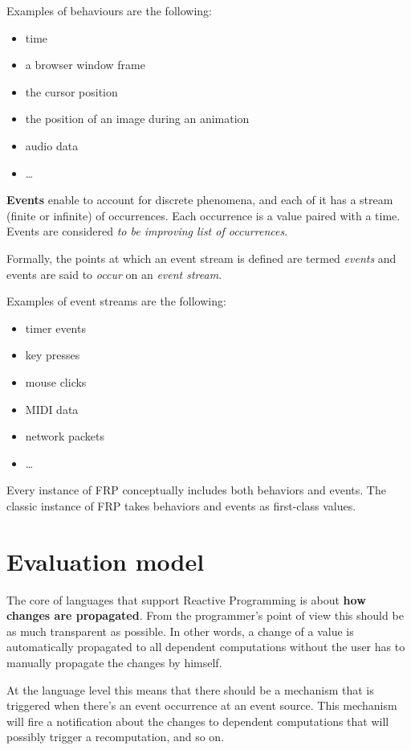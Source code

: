 Examples of behaviours are the following:

\begin{itemize}
\itemsep1pt\parskip0pt
\item
  time
\item
  a browser window frame
\item
  the cursor position
\item
  the position of an image during an animation
\item
  audio data
\item
  \ldots{}
\end{itemize}

\textbf{Events} enable to account for discrete phenomena, and each of it
has a stream (finite or infinite) of occurrences. Each occurrence is a
value paired with a time. Events are considered \emph{to be improving
list of occurrences}.

Formally, the points at which an event stream is defined are termed
\emph{events} and events are said to \emph{occur} on an \emph{event
stream}.

Examples of event streams are the following:

\begin{itemize}
\itemsep1pt\parskip0pt
\item
  timer events
\item
  key presses
\item
  mouse clicks
\item
  MIDI data
\item
  network packets
\item
  \ldots{}
\end{itemize}

Every instance of FRP conceptually includes both behaviors and events.
The classic instance of FRP takes behaviors and events as first-class
values.

\section{Evaluation model}\label{evaluation-model}

The core of languages that support Reactive Programming is about
\textbf{how changes are propagated}. From the programmer's point of view
this should be as much transparent as possible. In other words, a change
of a value is automatically propagated to all dependent computations
without the user has to manually propagate the changes by himself.

At the language level this means that there should be a mechanism that
is triggered when there's an event occurrence at an event source. This
mechanism will fire a notification about the changes to dependent
computations that will possibly trigger a recomputation, and so on.

